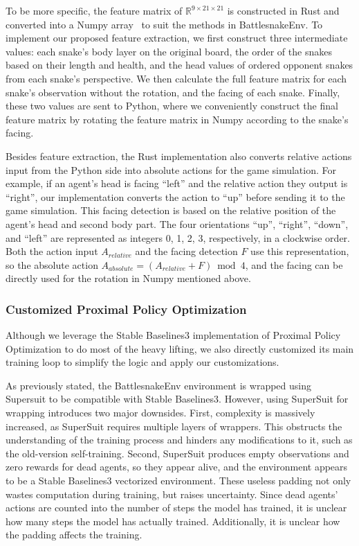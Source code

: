 \documentclass[conference]{IEEEtran}
\begin{document}
To be more specific,
the feature matrix of $\mathbb R^{9\times21\times21}$ is constructed in Rust and
converted into a Numpy array~\cite{harris2020array}
to suit the methods in \textsf{BattlesnakeEnv}.
To implement our proposed feature extraction,
we first construct three intermediate values:
each snake's body layer on the original board,
the order of the snakes based on their length and health,
and the head values of ordered opponent snakes from each snake's perspective.
We then calculate the full feature matrix for each snake's observation without
the rotation, and the facing of each snake. Finally,
these two values are sent to Python,
where we conveniently construct the final feature matrix by rotating the feature
matrix in Numpy according to the snake's facing.

Besides feature extraction,
the Rust implementation also converts relative actions input from the Python
side into absolute actions for the game simulation. For example,
if an agent's head is facing ``left'' and the relative action they output is
``right'',
our implementation converts the action to ``up'' before sending it to the game
simulation.
This facing detection is based on the relative position of the agent's head and
second body part. The four orientations ``up'', ``right'', ``down'',
and ``left'' are represented as integers 0, 1, 2, 3, respectively,
in a clockwise order.
Both the action input $A_{relative}$ and the facing detection $F$ use this
representation, so the absolute action $A_{absolute}=(A_{relative}+F)\bmod 4$,
and the facing can be directly used for the rotation in Numpy mentioned above.

\subsubsection{Customized Proximal Policy Optimization}

Although we leverage the Stable Baselines3 implementation of Proximal Policy
Optimization to do most of the heavy lifting,
we also directly customized its main training loop to simplify the logic and
apply our customizations.

As previously stated, the \textsf{BattlesnakeEnv} environment is wrapped using
Supersuit to be compatible with Stable Baselines3.
However, using SuperSuit for wrapping introduces two major downsides. First,
complexity is massively increased,
as SuperSuit requires multiple layers of wrappers.
This obstructs the understanding of the training process and hinders any
modifications to it, such as the old-version self-training. Second,
SuperSuit produces empty observations and zero rewards for dead agents,
so they appear alive,
and the environment appears to be a Stable Baselines3 vectorized environment.
These useless padding not only wastes computation during training,
but raises uncertainty.
Since dead agents' actions are counted into the number of steps the model has
trained, it is unclear how many steps the model has actually trained.
Additionally, it is unclear how the padding affects the training.
\end{document}
